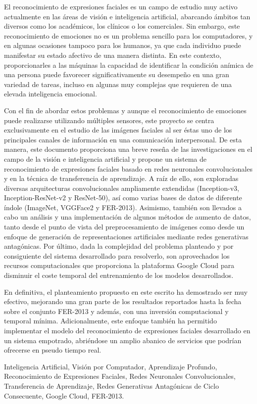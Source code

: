 \thispagestyle{plain}

\begin{resumen}
El reconocimiento de expresiones faciales es un campo de estudio muy activo actualmente en las áreas de visión e inteligencia artificial, abarcando ámbitos tan diversos como los académicos, los clínicos o los comerciales. Sin embargo, este reconocimiento de emociones no es un problema sencillo para los computadores, y en algunas ocasiones tampoco para los humanos, ya que cada individuo puede manifestar su estado afectivo de una manera distinta. En este contexto, proporcionarles a las máquinas la capacidad de identificar la condición anímica de una persona puede favorecer significativamente su desempeño en una gran variedad de tareas, incluso en algunas muy complejas que requieren de una elevada inteligencia emocional.

Con el fin de abordar estos problemas y aunque el reconocimiento de emociones puede realizarse utilizando múltiples sensores, este proyecto se centra exclusivamente en el estudio de las imágenes faciales al ser éstas uno de los principales canales de información en una comunicación interpersonal. De esta manera, este documento proporciona una breve reseña de las investigaciones en el campo de la visión e inteligencia artificial y propone un sistema de reconocimiento de expresiones faciales basado en redes neuronales convolucionales y en la técnica de transferencia de aprendizaje. A raíz de ello, son exploradas diversas arquitecturas convolucionales ampliamente extendidas (Inception-v3, Inception-ResNet-v2 y ResNet-50), así como varias bases de datos de diferente índole (ImageNet, VGGFace2 y FER-2013). Asimismo, también son llevados a cabo un análisis y una implementación de algunos métodos de aumento de datos, tanto desde el punto de vista del preprocesamiento de imágenes como desde un enfoque de generación de representaciones artificiales mediante redes generativas antagónicas. Por último, dada la complejidad del problema planteado y por consiguiente del sistema desarrollado para resolverlo, son aprovechados los recursos computacionales que proporciona la plataforma Google Cloud para disminuir el coste temporal del entrenamiento de los modelos desarrollados.

En definitiva, el planteamiento propuesto en este escrito ha demostrado ser muy efectivo, mejorando una gran parte de los resultados reportados hasta la fecha sobre el conjunto FER-2013 y además, con una inversión computacional y temporal mínima. Adicionalmente, este enfoque también ha permitido implementar el modelo del reconocimiento de expresiones faciales desarrollado en un sistema empotrado, abriéndose un amplio abanico de servicios que podrían ofrecerse en pseudo tiempo real.
\end{resumen}

\begin{palabrasclave}
Inteligencia Artificial, Visión por Computador, Aprendizaje Profundo, Reconocimiento de Expresiones Faciales, Redes Neuronales Convolucionales, Transferencia de Aprendizaje, Redes Generativas Antagónicas de Ciclo Consecuente, Google Cloud, FER-2013.
\end{palabrasclave}
